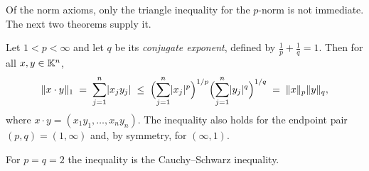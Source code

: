Of the norm axioms, only the triangle inequality for the $p$-norm is not
immediate. The next two theorems supply it.

\begin{theorem}\label{thm:holder}
Let $1 < p < \infty$ and let $q$ be its \emph{conjugate exponent}, defined by
$\frac{1}{p} + \frac{1}{q} = 1$. Then for all $x, y \in \mathbb{K}^n$,
\begin{equation}\label{eq:holder}
  \lVert x \cdot y\rVert_1 \;=\; \sum_{j=1}^{n} \lvert x_j y_j\rvert
  \;\le\; \Bigl(\sum_{j=1}^{n} \lvert x_j\rvert^p\Bigr)^{1/p}
          \Bigl(\sum_{j=1}^{n} \lvert y_j\rvert^q\Bigr)^{1/q}
  \;=\; \lVert x\rVert_p \lVert y\rVert_q ,
\end{equation}
where $x \cdot y = (x_1y_1, \dots, x_ny_n)$. The inequality also holds for the
endpoint pair $(p,q) = (1,\infty)$ and, by symmetry, for $(\infty, 1)$.
\end{theorem}

\begin{remark}
For $p = q = 2$ the inequality is the Cauchy--Schwarz inequality.
\end{remark}

